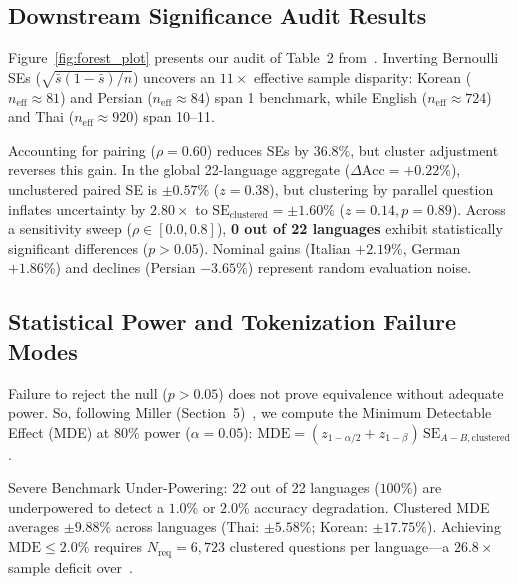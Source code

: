 \documentclass[sigconf,nonacm]{acmart}
\begin{document}
\subsection{Downstream Significance Audit Results}
\label{sec:results_significance}

Figure~\ref{fig:forest_plot} presents our audit of Table~2 from~\cite{foroutan2026parity}. Inverting Bernoulli SEs ($\sqrt{\bar{s}(1-\bar{s})/n}$) uncovers an $11\times$ effective sample disparity: Korean ($n_{\mathrm{eff}} \approx 81$) and Persian ($n_{\mathrm{eff}} \approx 84$) span 1 benchmark, while English ($n_{\mathrm{eff}} \approx 724$) and Thai ($n_{\mathrm{eff}} \approx 920$) span 10--11.

Accounting for pairing ($\rho = 0.60$) reduces SEs by $36.8\%$, but cluster adjustment reverses this gain. In the global 22-language aggregate ($\Delta\mathrm{Acc} = +0.22\%$), unclustered paired SE is $\pm 0.57\%$ ($z = 0.38$), but clustering by parallel question inflates uncertainty by $\mathbf{2.80\times}$ to $\mathrm{SE}_{\mathrm{clustered}} = \pm 1.60\%$ ($z = 0.14, p = 0.89$). Across a sensitivity sweep ($\rho \in [0.0, 0.8]$), \textbf{0 out of 22 languages} exhibit statistically significant differences ($p > 0.05$). Nominal gains (Italian $+2.19\%$, German $+1.86\%$) and declines (Persian $-3.65\%$) represent random evaluation noise.

\subsection{Statistical Power and Tokenization Failure Modes}
\label{sec:power_and_failures}

Failure to reject the null ($p > 0.05$) does not prove equivalence without adequate power. So, following Miller (Section~5)~\cite{miller2024adding}, we compute the Minimum Detectable Effect (MDE) at $80\%$ power ($\alpha=0.05$): $\mathrm{MDE} = (z_{1-\alpha/2} + z_{1-\beta})\,\mathrm{SE}_{A-B,\mathrm{clustered}}$.

{Severe Benchmark Under-Powering:} {22 out of 22 languages ($100\%$)} are underpowered to detect a $1.0\%$ or $2.0\%$ accuracy degradation. Clustered MDE averages $\mathbf{\pm 9.88\%}$ across languages (Thai: $\pm 5.58\%$; Korean: $\pm 17.75\%$). Achieving $\mathrm{MDE} \le 2.0\%$ requires $N_{\mathrm{req}} = 6{,}723$ clustered questions per language---a $\mathbf{26.8\times}$ sample deficit over~\cite{foroutan2026parity}.
\end{document}
